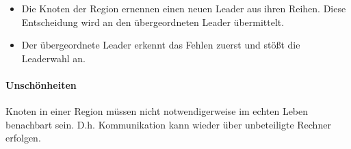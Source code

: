 \begin{itemize}
\item Die Knoten der Region ernennen einen neuen Leader aus ihren Reihen. Diese Entscheidung wird an den übergeordneten Leader übermittelt.
\item Der übergeordnete Leader erkennt das Fehlen zuerst und stößt die Leaderwahl an.
\end{itemize}

\paragraph{Unschönheiten}
Knoten in einer Region müssen nicht notwendigerweise im echten Leben benachbart sein. D.h. Kommunikation kann wieder über unbeteiligte Rechner erfolgen.
